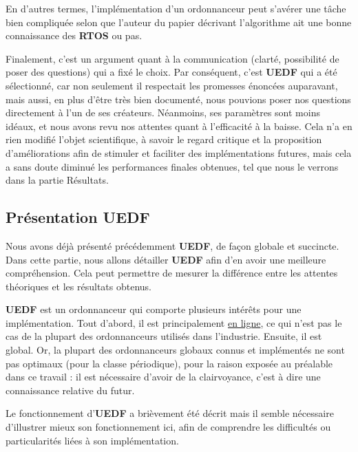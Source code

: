 	En d'autres termes, l'implémentation d'un ordonnanceur peut s'avérer une tâche bien compliquée selon que l'auteur du papier décrivant l'algorithme 
	ait une bonne connaissance des \textbf{RTOS} ou pas. 
	\newline

	
	Finalement, c'est un argument quant à la communication (clarté, possibilité de poser des questions) 
	qui a fixé le choix. Par conséquent, c'est \textbf{UEDF} qui a été sélectionné, car 
	non seulement il respectait 
	les promesses énoncées auparavant, mais aussi, en plus d'être très bien documenté, 
	nous pouvions poser nos questions directement à l'un de ses créateurs. Néanmoins, ses paramètres sont moins idéaux, 
	et nous avons revu nos attentes quant à l'efficacité à la baisse. Cela n'a en rien 
	modifié l'objet scientifique, à savoir le regard critique et la proposition d'améliorations 
	afin de stimuler et faciliter des implémentations futures, mais cela a sans doute 
	diminué les performances finales obtenues, tel que nous le verrons dans la partie Résultats.\newline
	
	
	\subsection{Présentation UEDF}
	
	Nous avons déjà présenté précédemment \textbf{UEDF}, de façon globale et succincte. 
	Dans cette partie, nous allons détailler \textbf{UEDF} afin d'en avoir une meilleure compréhension. Cela peut 
	permettre de mesurer la différence entre les attentes théoriques et les résultats obtenus.\newline

	\textbf{UEDF} est un ordonnanceur qui comporte plusieurs intérêts pour une implémentation.
	Tout d'abord, il est principalement \hyperref[inline]{en ligne}, ce qui n'est pas le cas de 
	la plupart des ordonnanceurs utilisés dans l'industrie. 
	Ensuite, il est global. Or, la plupart des ordonnanceurs 
	globaux connus et implémentés ne sont pas optimaux (pour la classe périodique), pour la
	raison exposée au préalable dans ce travail : il est nécessaire d'avoir de la clairvoyance, 
	c'est à dire une connaissance relative du futur.\newline
	
	Le fonctionnement d'\textbf{UEDF} a brièvement été décrit mais il semble nécessaire d'illustrer 
	mieux son fonctionnement ici, afin de comprendre les difficultés ou particularités liées 
	à son implémentation.\newline
	
